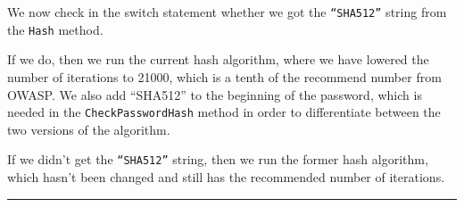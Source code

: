 We now check in the switch statement whether we got the \texttt{“SHA512”} string from the \texttt{Hash} method.

If we do, then we run the current hash algorithm, where we have lowered the number of iterations to 21000, which is a tenth of the recommend number from OWASP. We also add ``SHA512'' to the beginning of the password, which is needed in the \texttt{CheckPasswordHash} method in order to differentiate between the two versions of the algorithm.

If we didn't get the \texttt{“SHA512”} string, then we run the former hash algorithm, which hasn't been changed and still has the recommended number of iterations.

\begin{center}\rule{0.5\linewidth}{0.5pt}\end{center}




